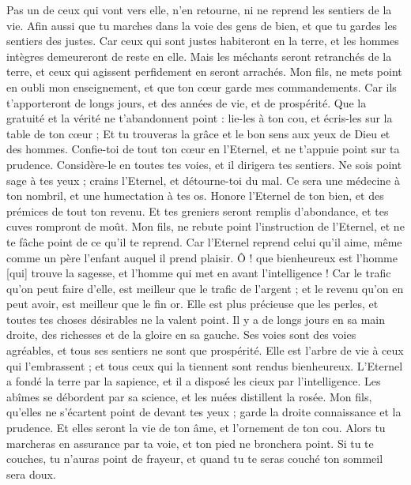 \begin{multicols}{2}
Pas un de ceux qui vont vers elle, n'en retourne, ni ne reprend les sentiers de la vie.
Afin aussi que tu marches dans la voie des gens de bien, et que tu gardes les sentiers des justes.
Car ceux qui sont justes habiteront en la terre, et les hommes intègres demeureront de reste en elle.
Mais les méchants seront retranchés de la terre, et ceux qui agissent perfidement en seront arrachés.
\VerseOne{}Mon fils, ne mets point en oubli mon enseignement, et que ton cœur garde mes commandements.
Car ils t'apporteront de longs jours, et des années de vie, et de prospérité.
Que la gratuité et la vérité ne t'abandonnent point : lie-les à ton cou, et écris-les sur la table de ton cœur ;
Et tu trouveras la grâce et le bon sens aux yeux de Dieu et des hommes.
Confie-toi de tout ton cœur en l'Eternel, et ne t'appuie point sur ta prudence.
Considère-le en toutes tes voies, et il dirigera tes sentiers.
Ne sois point sage à tes yeux ; crains l'Eternel, et détourne-toi du mal.
Ce sera une médecine à ton nombril, et une humectation à tes os.
Honore l'Eternel de ton bien, et des prémices de tout ton revenu.
Et tes greniers seront remplis d'abondance, et tes cuves rompront de moût.
Mon fils, ne rebute point l'instruction de l'Eternel, et ne te fâche point de ce qu'il te reprend.
Car l'Eternel reprend celui qu'il aime, même comme un père l'enfant auquel il prend plaisir.
Ô ! que bienheureux est l'homme [qui] trouve la sagesse, et l'homme qui met en avant l'intelligence !
Car le trafic qu'on peut faire d'elle, est meilleur que le trafic de l'argent ; et le revenu qu'on en peut avoir, est meilleur que le fin or.
Elle est plus précieuse que les perles, et toutes tes choses désirables ne la valent point.
Il y a de longs jours en sa main droite, des richesses et de la gloire en sa gauche.
Ses voies sont des voies agréables, et tous ses sentiers ne sont que prospérité.
Elle est l'arbre de vie à ceux qui l'embrassent ; et tous ceux qui la tiennent sont rendus bienheureux.
L'Eternel a fondé la terre par la sapience, et il a disposé les cieux par l'intelligence.
Les abîmes se débordent par sa science, et les nuées distillent la rosée.
Mon fils, qu'elles ne s'écartent point de devant tes yeux ; garde la droite connaissance et la prudence.
Et elles seront la vie de ton âme, et l'ornement de ton cou.
Alors tu marcheras en assurance par ta voie, et ton pied ne bronchera point.
Si tu te couches, tu n'auras point de frayeur, et quand tu te seras couché ton sommeil sera doux.

\end{multicols}

